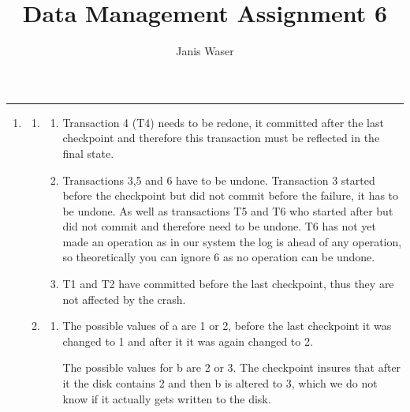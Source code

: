 \documentclass[12pt]{extarticle}
\title{Data Management Assignment 6}
\author{Janis Waser}
\begin{document}
\maketitle \vspace{-10mm}
\rule{\linewidth}{0.4pt}


\begin{flushleft}
\begin{enumerate}[label=\textbf{\Alph*.}]

\item 
\begin{enumerate}[label=\arabic*.]
\item \begin{enumerate}[label=(\alph*)]
\item Transaction 4 (T4) needs to be redone, it committed after the last checkpoint and therefore this transaction must be reflected in the final state.
\item Transactions 3,5 and 6 have to be undone. Transaction 3 started before the checkpoint but did not commit before the failure, it has to be undone. As well as transactions T5 and T6 who started after but did not commit and therefore need to be undone. T6 has not yet made an operation as in our system the log is ahead of any operation, so theoretically you can ignore 6 as no operation can be undone.
\item T1 and T2 have committed before the last checkpoint, thus they are not affected by the crash.
\end{enumerate}
 \item \begin{enumerate}[label=(\alph*)] 
\item The possible values of a are 1 or 2, before the last checkpoint it was changed to 1 and after it it was again changed to 2. 

The possible values for b are 2 or 3. The checkpoint insures that after it the disk contains 2 and then b is altered to 3, which we do not know if it actually gets written to the disk. 


\end{enumerate}
\end{enumerate}
\end{enumerate}
\end{flushleft}
\end{document}

